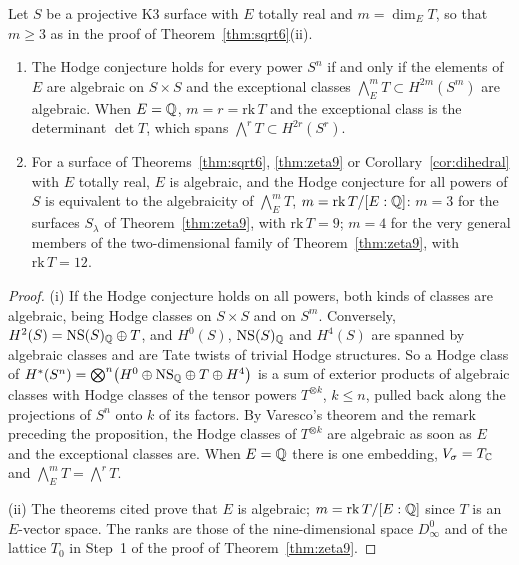 \begin{proposition}\label{prop:powers}
Let $S$ be a projective K3 surface with $E$ totally real and $m=\dim_{E}T$, so that $m\ge3$ as in the proof of Theorem~\ref{thm:sqrt6}(ii).
\begin{enumerate}[label=\textup{(\roman*)},leftmargin=2.4em,itemsep=2pt]
\item The Hodge conjecture holds for every power $S^{n}$ if and only if the elements of $E$ are algebraic on $S\times S$ and the exceptional classes $\bigwedge^{m}_{E}T\subset H^{2m}(S^{m})$ are algebraic. When $E=\mathbb{Q}$, $m=r=\mathrm{rk}\,T$ and the exceptional class is the determinant $\det T$, which spans $\bigwedge^{r}T\subset H^{2r}(S^{r})$.
\item For a surface of Theorems~\ref{thm:sqrt6}, \ref{thm:zeta9} or Corollary~\ref{cor:dihedral} with $E$ totally real, $E$ is algebraic, and the Hodge conjecture for all powers of $S$ is equivalent to the algebraicity of $\bigwedge^{m}_{E}T$, $m=\mathrm{rk}\,T/[E:\mathbb{Q}]$: $m=3$ for the surfaces $S_{\lambda}$ of Theorem~\ref{thm:zeta9}, with $\mathrm{rk}\,T=9$; $m=4$ for the very general members of the two-dimensional family of Theorem~\ref{thm:zeta9}, with $\mathrm{rk}\,T=12$.
\end{enumerate}
\end{proposition}

\begin{proof}
(i) If the Hodge conjecture holds on all powers, both kinds of classes are algebraic, being Hodge classes on $S\times S$ and on $S^{m}$. Conversely, $H^{2}(S)=\mathrm{NS}(S)_{\mathbb{Q}}\oplus T$, and $H^{0}(S)$, $\mathrm{NS}(S)_{\mathbb{Q}}$ and $H^{4}(S)$ are spanned by algebraic classes and are Tate twists of trivial Hodge structures. So a Hodge class of $H^{*}(S^{n})=\bigotimes^{n}\bigl(H^{0}\oplus\mathrm{NS}_{\mathbb{Q}}\oplus T\oplus H^{4}\bigr)$ is a sum of exterior products of algebraic classes with Hodge classes of the tensor powers $T^{\otimes k}$, $k\le n$, pulled back along the projections of $S^{n}$ onto $k$ of its factors. By Varesco's theorem and the remark preceding the proposition, the Hodge classes of $T^{\otimes k}$ are algebraic as soon as $E$ and the exceptional classes are. When $E=\mathbb{Q}$ there is one embedding, $V_{\sigma}=T_{\mathbb{C}}$ and $\bigwedge^{m}_{E}T=\bigwedge^{r}T$.

(ii) The theorems cited prove that $E$ is algebraic; $m=\mathrm{rk}\,T/[E:\mathbb{Q}]$ since $T$ is an $E$-vector space. The ranks are those of the nine-dimensional space $D_{\infty}^{0}$ and of the lattice $T_{0}$ in Step~1 of the proof of Theorem~\ref{thm:zeta9}.
\end{proof}

